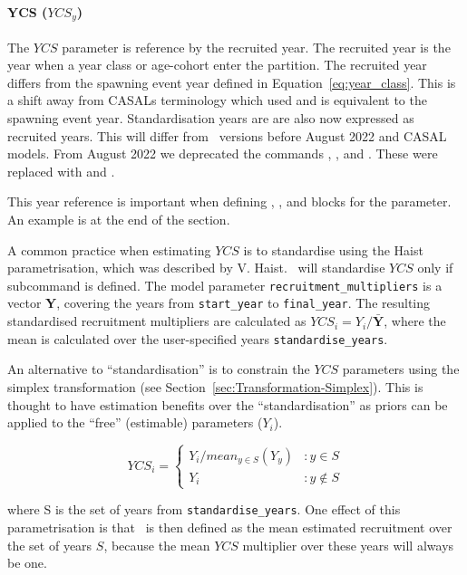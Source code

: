 \paragraph*{YCS ($YCS_y$)}

The $YCS$ parameter is reference by the recruited year. The recruited year is the year when a year class or age-cohort enter the partition. The recruited year differs from the spawning event year defined in Equation~\eqref{eq:year_class}. This is a shift away from CASALs terminology which used  and is equivalent to the spawning event year. Standardisation years are are also now expressed as recruited years. This will differ from \CNAME\ versions before August 2022 and CASAL models. From August 2022 we deprecated the commands , , and . These were replaced with  and .

This year reference is important when defining , , and  blocks for the  parameter. An example is at the end of the section.

A common practice when estimating $YCS$ is to standardise using the Haist parametrisation, which was described by V. Haist. \CNAME\ will standardise $YCS$ only if subcommand  is defined. The model parameter \texttt{recruitment\_multipliers} is a vector \textbf{Y}, covering the years from \texttt{start\_year} to \texttt{final\_year}. The resulting standardised recruitment multipliers are calculated as $YCS_i=Y_i/\bar{\textbf{Y}}$, where the mean is calculated over the user-specified years \texttt{standardise\_years}.

An alternative to \enquote{standardisation} is to constrain the $YCS$ parameters using the simplex transformation (see Section~\ref{sec:Transformation-Simplex}). This is thought to have estimation benefits over the \enquote{standardisation} as priors can be applied to the \enquote{free} (estimable) parameters (\(Y_i\)).

\[
YCS_i =
\begin{cases}
Y_i / mean_{y \in S}(Y_y) & :y \in S\\
Y_i					 & :y \notin S
\end{cases}
\]

where S is the set of years from \texttt{standardise\_years}. One effect of this parametrisation is that \Rzero\ is then defined as the mean estimated recruitment over the set of years $S$, because the mean $YCS$ multiplier over these years will always be one.

